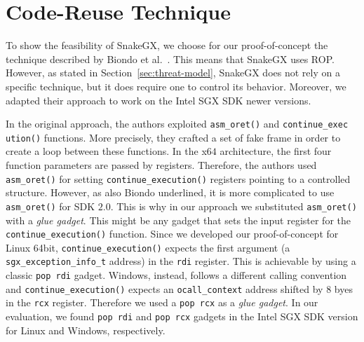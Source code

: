 \chapter{Code-Reuse Technique}
\label{ssec:my-rop-chain}
To show the feasibility of SnakeGX, we choose for our proof-of-concept
the technique described by Biondo et al.~\cite{biondo2018guard}.
This means that SnakeGX uses ROP. 
However, as stated in Section~\ref{sec:threat-model}, 
SnakeGX does not rely on a specific technique, but it does require one to 
control its behavior.
Moreover, we adapted their approach to work on the Intel SGX SDK newer versions.

In the original approach, the authors exploited \texttt{asm\_oret()} and 
\texttt{continue\_exec\\ution()} functions.
More precisely, they crafted a set of fake frame in order to create a loop between these functions.
In the x$64$ architecture, the first four function parameters are passed by registers.
Therefore, the authors used \texttt{asm\_oret()} for setting \texttt{continue\_execution()} registers pointing to a controlled structure.
However, as also Biondo underlined, it is more complicated to use 
\texttt{asm\_oret()} for SDK $2.0$.
This is why in our approach we substituted \texttt{asm\_oret()} with a 
\emph{glue gadget}.
This might be any gadget that sets the input register for the \texttt{continue\_execution()} function.
Since we developed our proof-of-concept for Linux 64bit, \texttt{continue\_execution()} expects the first argument
(\ie a \texttt{sgx\_exception\_info\_t} address) in the \texttt{rdi} register.
This is achievable by using a classic \texttt{pop rdi} gadget. 
Windows, instead, follows a different calling convention
and \texttt{continue\_execution()} expects an \texttt{ocall\_context} address shifted by $8$ byes in the \texttt{rcx} register.
Therefore we used a \texttt{pop rcx} as a \emph{glue gadget}.
In our evaluation, we found \texttt{pop rdi} and \texttt{pop 
rcx} gadgets in the Intel SGX SDK version for Linux and Windows, respectively.

